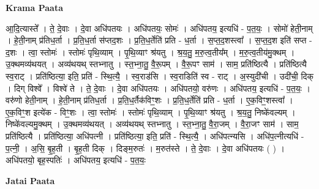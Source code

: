 \documentclass[17pt]{extarticle}
\begin{document}
\textbf{Krama Paata} \newline

आ॒दि॒त्यास्ते᳚ । ते॒ दे॒वाः । दे॒वा अधि॑पतयः । अधि॑पतयः॒ सोमः॑ । अधि॑पतय॒ इत्यधि॑ - प॒त॒यः॒ । सोमो॑ हेती॒नाम् । हे॒ती॒नाम् प्र॑तिध॒र्ता । प्र॒ति॒ध॒र्ता स॑प्तद॒शः । प्र॒ति॒ध॒र्तेति॑ प्रति - ध॒र्ता । स॒प्त॒द॒शस्त्वा᳚ । स॒प्त॒द॒श इति॑ सप्त - द॒शः । त्वा॒ स्तोमः॑ । स्तोमः॑ पृथि॒व्याम् । पृ॒थि॒व्याꣳ श्र॑यतु । श्र॒य॒तु॒ म॒रु॒त्व॒तीय᳚म् । म॒रु॒त्व॒तीय॑मु॒क्थम् । उ॒क्थमव्य॑थयत् । अव्य॑थयथ् स्तभ्नातु । स्त॒भ्ना॒तु॒ वै॒रू॒पम् । वै॒रू॒पꣳ साम॑ । साम॒ प्रति॑ष्ठित्यै । प्रति॑ष्ठित्यै स्व॒राट् । प्रति॑ष्ठित्या॒ इति॒ प्रति॑ - स्थि॒त्यै॒ । स्व॒राड॑सि । स्व॒राडिति॑ स्व - राट् । अ॒स्युदी॑ची । उदी॑ची॒ दिक् । दिग् विश्वे᳚ । विश्वे॑ ते । ते॒ दे॒वाः । दे॒वा अधि॑पतयः । अधि॑पतयो॒ वरु॑णः । अधि॑पतय॒ इत्यधि॑ - प॒त॒यः॒ । वरु॑णो हेती॒नाम् । हे॒ती॒नाम् प्र॑तिध॒र्ता । प्र॒ति॒ध॒र्तैक॑विꣳ॒॒शः । प्र॒ति॒ध॒र्तेति॑ प्रति - ध॒र्ता । ए॒क॒विꣳ॒॒शस्त्वा᳚ । ए॒क॒विꣳ॒॒श इत्ये॑क - विꣳ॒॒शः । त्वा॒ स्तोमः॑ । स्तोमः॑ पृथि॒व्याम् । पृ॒थि॒व्याꣳ श्र॑यतु । श्र॒य॒तु॒ निष्के॑वल्यम् । निष्के॑वल्यमु॒क्थम् । उ॒क्थमव्य॑थयत् । अव्य॑थयथ् स्तभ्नातु । स्त॒भ्ना॒तु॒ वै॒रा॒जम् । वै॒रा॒जꣳ साम॑ । साम॒ प्रति॑ष्ठित्यै । प्रति॑ष्ठित्या॒ अधि॑पत्नी । प्रति॑ष्ठित्या॒ इति॒ प्रति॑ - स्थि॒त्यै॒ । अधि॑पत्न्यसि । अधि॑प॒त्नीत्यधि॑ - प॒त्नी॒ । अ॒सि॒ बृ॒ह॒ती । बृ॒ह॒ती दिक् । दिङ्म॒रुतः॑ । म॒रुत॑स्ते । ते॒ दे॒वाः । दे॒वा अधि॑पतयः ( ) । अधि॑पतयो॒ बृह॒स्पतिः॑ । अधि॑पतय॒ इत्यधि॑ - प॒त॒यः॒ \newline

\textbf{Jatai Paata} \newline
\end{document}
